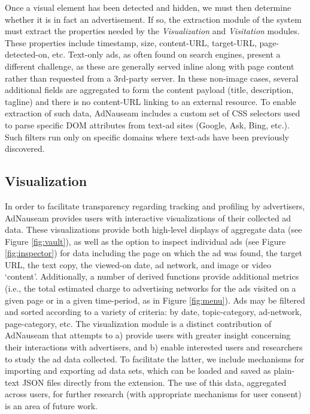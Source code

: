 \documentclass[conference]{IEEEtran}
\begin{document}
Once a visual element has been detected and hidden, we must then determine whether it is in fact an advertisement. If so, the extraction module of the system must extract the properties needed by the \emph{Visualization} and \emph{Visitation} modules. These properties include timestamp, size, content-URL, target-URL, page-detected-on, etc. Text-only ads, as often found on search engines, present a different challenge, as these are generally served inline along with page content rather than requested from a 3rd-party server. In these non-image cases, several additional fields are aggregated to form the content payload (title, description, tagline) and there is no content-URL linking to an external resource. To enable extraction of such data, AdNauseam includes a custom set of CSS selectors used to parse specific DOM attributes from text-ad sites (Google, Ask, Bing, etc.). Such filters run only on specific domains where text-ads have been previously discovered.


\subsection{Visualization}

In order to facilitate transparency regarding tracking and profiling by advertisers, AdNauseam provides users with interactive visualizations of their collected ad data. These visualizations provide both high-level displays of aggregate data (see Figure \ref{fig:vault}), as well as the option to inspect individual ads (see Figure \ref{fig:inspector}) for data including the page on which the ad was found, the target URL, the text copy, the viewed-on date, ad network, and image or video ‘content’. Additionally, a number of derived functions provide additional metrics (i.e., the total estimated charge to advertising networks for the ads visited on a given page or in a given time-period, as in Figure \ref{fig:menu}). Ads may be filtered and sorted according to a variety of criteria: by date, topic-category, ad-network, page-category, etc. The visualization module is a distinct contribution of AdNauseam that attempts to a) provide users with greater insight concerning their interactions with advertisers, and b) enable interested users and researchers to study the ad data collected. To facilitate the latter, we include mechanisms for importing and exporting ad data sets, which can be loaded and saved as plain-text JSON files directly from the extension. The use of this data, aggregated across users, for further research (with appropriate mechanisms for user consent) is an area of future work.
\end{document}
